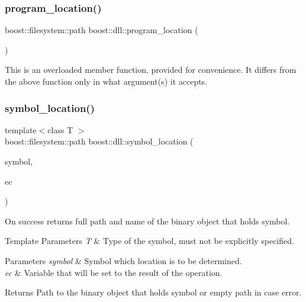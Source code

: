 \subsubsection{\texorpdfstring{program\+\_\+location()}{program\_location()}\hspace{0.1cm}{\footnotesize\ttfamily [2/2]}}
{\footnotesize\ttfamily boost\+::filesystem\+::path boost\+::dll\+::program\+\_\+location (\begin{DoxyParamCaption}{ }\end{DoxyParamCaption})\hspace{0.3cm}{\ttfamily [inline]}}

This is an overloaded member function, provided for convenience. It differs from the above function only in what argument(s) it accepts. \mbox{\label{a00266_file_a91b824b8cdf4e600546d636fd09672f9}} 
\subsubsection{\texorpdfstring{symbol\+\_\+location()}{symbol\_location()}\hspace{0.1cm}{\footnotesize\ttfamily [1/2]}}
{\footnotesize\ttfamily template$<$class T $>$ \\
boost\+::filesystem\+::path boost\+::dll\+::symbol\+\_\+location (\begin{DoxyParamCaption}\item[{const T \&}]{symbol,  }\item[{boost\+::system\+::error\+\_\+code \&}]{ec }\end{DoxyParamCaption})\hspace{0.3cm}{\ttfamily [inline]}}

On success returns full path and name of the binary object that holds symbol.


\begin{DoxyTemplParams}{Template Parameters}
{\em T} & Type of the symbol, must not be explicitly specified. \\
\hline
\end{DoxyTemplParams}

\begin{DoxyParams}{Parameters}
{\em symbol} & Symbol which location is to be determined. \\
\hline
{\em ec} & Variable that will be set to the result of the operation. \\
\hline
\end{DoxyParams}
\begin{DoxyReturn}{Returns}
Path to the binary object that holds symbol or empty path in case error. 
\end{DoxyReturn}

